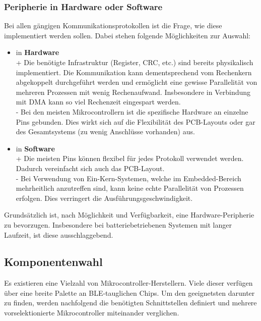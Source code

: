 \documentclass[12pt]{article}
\begin{document}
	\subsubsection*{Peripherie in Hardware oder Software}
	Bei allen gängigen Kommunikationsprotokollen ist die Frage, wie diese implementiert werden sollen. Dabei stehen folgende Möglichkeiten zur Auswahl:
	\begin{itemize}
		\item in \textbf{Hardware} \\
		+ Die benötigte Infrastruktur (Register, CRC, etc.) sind bereits physika\-lisch implementiert. Die Kommunikation kann dementsprechend vom Rechenkern abgekoppelt durchgeführt werden und ermöglicht eine ge\-wisse Parallelität von mehreren Prozessen mit wenig Rechenaufwand. Insbesondere in Verbindung mit DMA kann so viel Rechenzeit eingespart werden. \\
		- Bei den meisten Mikrocontrollern ist die spezifische Hardware an einzelne Pins gebunden. Dies wirkt sich auf die Flexibilität des PCB-Layouts oder gar des Gesamtsystems (zu wenig Anschlüsse vorhanden) aus.
		\item in \textbf{Software} \\
		+ Die meisten Pins können flexibel für jedes Protokoll verwendet werden. Dadurch vereinfacht sich auch das PCB-Layout.\\
		- Bei Verwendung von Ein-Kern-Systemen, welche im Embedded-Bereich mehrheitlich anzutreffen sind, kann keine echte Parallelität von Prozessen erfolgen. Dies verringert die Ausführungsgeschwindigkeit.
	\end{itemize}
	Grundsätzlich ist, nach Möglichkeit und Verfügbarkeit, eine Hardware-Peripherie zu bevorzugen. Insbesondere bei batteriebetriebenen Systemen mit langer Laufzeit, ist diese ausschlaggebend.
	\subsection{Komponentenwahl}
	Es existieren eine Vielzahl von Mikrocontroller-Herstellern. Viele dieser verfügen über eine breite Palette an BLE-tauglichen Chips. Um den geeignetsten darunter zu finden, werden nachfolgend die benötigten Schnittstellen definiert und mehrere vorselektionierte Mikrocontroller miteinander verglichen.
\end{document}
